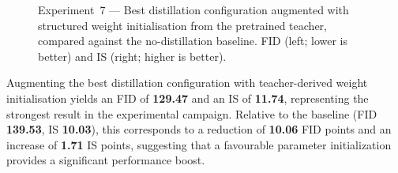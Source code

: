 \begin{figure}[ht]
    \centering
    \begin{subfigure}[b]{0.44\linewidth}
        \centering
    \end{subfigure}
    \hfill
    \begin{subfigure}[b]{0.44\linewidth}
        \centering
    \end{subfigure}
    \caption{Experiment~7 — Best distillation configuration augmented with
    structured weight initialisation from the pretrained teacher, compared
    against the no-distillation baseline. FID (left; lower is better) and
    IS (right; higher is better).}
    \label{fig:exp7_results}
\end{figure}

Augmenting the best distillation configuration with teacher-derived weight
initialisation yields an FID of \textbf{129.47} and an IS of \textbf{11.74},
representing the strongest result in the experimental campaign. Relative
to the baseline (FID \textbf{139.53}, IS \textbf{10.03}), this corresponds
to a reduction of \textbf{10.06} FID points and an increase of
\textbf{1.71} IS points, suggesting that a favourable
parameter initialization provides a significant performance boost.

